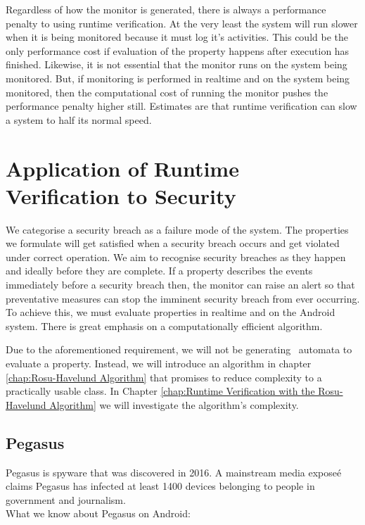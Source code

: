 Regardless of how the monitor is generated, there is always a performance penalty to using runtime verification.  At the very least the system will run slower when it is being monitored because it must log it's activities.  This could be the only performance cost if evaluation of the property happens after execution has finished.  Likewise, it is not essential that the monitor runs on the system being monitored.  But, if monitoring is performed in realtime and on the system being monitored, then the computational cost of running the monitor pushes the performance penalty higher still.  Estimates are that runtime verification can slow a system to half its normal speed.

\section{Application of Runtime Verification to Security}

We categorise a security breach as a failure mode of the system.  The properties we formulate will get satisfied when a security breach occurs and get violated under correct operation.  We aim to recognise security breaches as they happen and ideally before they are complete.  If a property describes the events immediately before a security breach then, the monitor can raise an alert so that preventative measures can stop the imminent security breach from ever occurring.  To achieve this, we must evaluate properties in realtime and on the Android system.  There is great emphasis on a computationally efficient algorithm.

Due to the aforementioned requirement, we will not be generating \Buchi\ automata to evaluate a property.  Instead, we will introduce an algorithm in chapter \ref{chap:Rosu-Havelund Algorithm} that promises to reduce complexity to a practically usable class.  In Chapter \ref{chap:Runtime Verification with the Rosu-Havelund Algorithm} we will investigate the algorithm's complexity.

\subsection{Pegasus}

Pegasus is spyware that was discovered in 2016.  A mainstream media expose\'e \cite{PegasusGuardian} claims Pegasus has infected at least 1400 devices belonging to people in government and journalism.\\

What we know about Pegasus on Android\cite{PegasusOnAndroid}:

